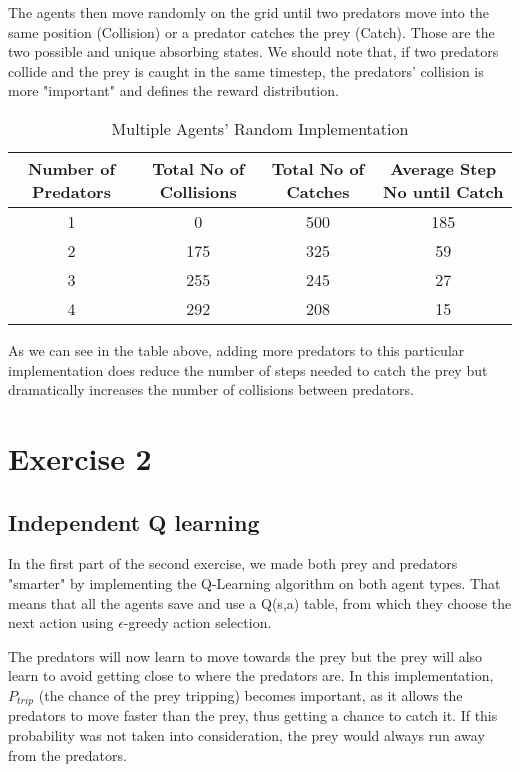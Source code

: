 \documentclass[a4paper,11pt]{article}
\begin{document}
The agents then move randomly on the grid until two predators move into the same position (Collision) or a predator catches the prey (Catch). Those are the two possible and unique absorbing states. We should note that, if two predators collide and the prey is caught in the same timestep, the predators' collision is more "important" and defines the reward distribution.



\begin{table}[h]
\begin{center}
\caption{Multiple Agents' Random Implementation}
\begin{tabular}{c c c c} 
\hline\hline               
Number of Predators & Total No of Collisions & Total No of Catches & Average Step No until Catch \\  
\hline
1 & 0 & 500 & 185\\ 
2 & 175 & 325  & 59\\
3 & 255 & 245   & 27\\
4 & 292 & 208 & 15 \\ 
\end{tabular}
\label{table:multirandom} 
\end{center} 
\end{table} 
\begin{center}

\end{center}

As we can see in the table above, adding more predators to this particular implementation does reduce the number of steps needed to catch the prey but dramatically increases the number of collisions between predators.
 

\section*{Exercise 2}

\subsection*{Independent Q learning}
In the first part of the second exercise, we made both prey and predators "smarter" by implementing the Q-Learning algorithm on both agent types. That means that all the agents save and use a Q(s,a) table, from which they choose the next action using $\epsilon$-greedy action selection.

The predators will now learn to move towards the prey but the prey will also learn to avoid getting close to where the predators are. In this implementation, $P_{trip}$ (the chance of the prey tripping) becomes important, as it allows the predators to move faster than the prey, thus getting a chance to catch it. If this probability was not taken into consideration, the prey would always run away from the predators.
\end{document}
